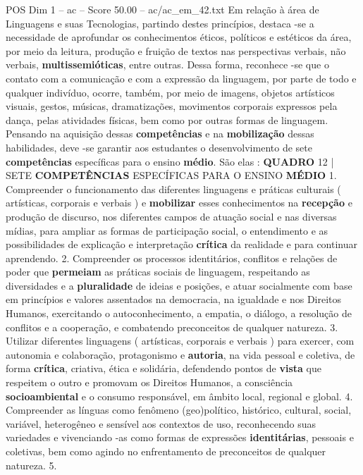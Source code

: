 \begin{textsample}{POS Dim 1 – ac – Score 50.00 – ac/ac\_em\_42.txt}
Em relação à área de Linguagens e suas Tecnologias, partindo destes princípios, destaca -se a necessidade de aprofundar os conhecimentos éticos, políticos e estéticos da área, por meio da leitura, produção e fruição de textos nas perspectivas verbais, não verbais, \textbf{multissemióticas}, entre outras.
Dessa forma, reconhece -se que o contato com a comunicação e com a expressão da linguagem, por parte de todo e qualquer indivíduo, ocorre, também, por meio de imagens, objetos artísticos visuais, gestos, músicas, dramatizações, movimentos corporais expressos pela dança, pelas atividades físicas, bem como por outras formas de linguagem.
Pensando na aquisição dessas \textbf{competências} e na \textbf{mobilização} dessas habilidades, deve -se garantir aos estudantes o desenvolvimento de sete \textbf{competências} específicas para o ensino \textbf{médio}.
São elas : \textbf{QUADRO} 12 | SETE \textbf{COMPETÊNCIAS} ESPECÍFICAS PARA O ENSINO \textbf{MÉDIO} 1.
Compreender o funcionamento das diferentes linguagens e práticas culturais ( artísticas, corporais e verbais ) e \textbf{mobilizar} esses conhecimentos na \textbf{recepção} e produção de discurso, nos diferentes campos de atuação social e nas diversas mídias, para ampliar as formas de participação social, o entendimento e as possibilidades de explicação e interpretação \textbf{crítica} da realidade e para continuar aprendendo. 2.
Compreender os processos identitários, conflitos e relações de poder que \textbf{permeiam} as práticas sociais de linguagem, respeitando as diversidades e a \textbf{pluralidade} de ideias e posições, e atuar socialmente com base em princípios e valores assentados na democracia, na igualdade e nos Direitos Humanos, exercitando o autoconhecimento, a empatia, o diálogo, a resolução de conflitos e a cooperação, e combatendo preconceitos de qualquer natureza. 3.
Utilizar diferentes linguagens ( artísticas, corporais e verbais ) para exercer, com autonomia e colaboração, protagonismo e \textbf{autoria}, na vida pessoal e coletiva, de forma \textbf{crítica}, criativa, ética e solidária, defendendo pontos de \textbf{vista} que respeitem o outro e promovam os Direitos Humanos, a consciência \textbf{socioambiental} e o consumo responsável, em âmbito local, regional e global. 4.
Compreender as línguas como fenômeno (geo)político, histórico, cultural, social, variável, heterogêneo e sensível aos contextos de uso, reconhecendo suas variedades e vivenciando -as como formas de expressões \textbf{identitárias}, pessoais e coletivas, bem como agindo no enfrentamento de preconceitos de qualquer natureza. 5.

\end{textsample}
